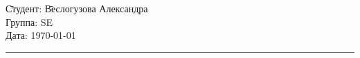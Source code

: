 \begin{tabbing}
\hspace{11cm} \= Студент: \= Веслогузова Александра \\
  \> Группа: \> SE \\
  \> Дата: \> \today
\end{tabbing}
\hrule
\vspace{1cm}

